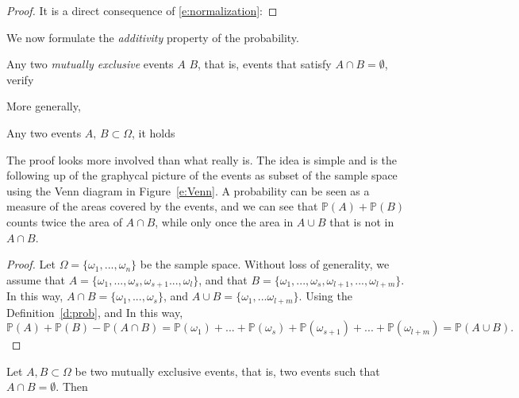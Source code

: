 	\begin{proof}
		It is a direct consequence of \eqref{e:normalization}:

	\end{proof}
	We now formulate the \emph{additivity} property of the probability. 
	\begin{proposition}[Additivity]
		\label{p:monotone}
		Any two \emph{mutually exclusive} events $A$ $B$, that is, events that satisfy  $A\cap B=\emptyset$, verify
	\end{proposition}
		More generally, 
	\begin{proposition}
		\label{p:exclusive}
		Any two events $A,\, B\subset \Omega$, it holds  
	\end{proposition}
	 The proof looks more involved than what really is. The idea is simple and is the following up of the graphycal picture of the events as subset of the sample space using the Venn diagram in Figure~\ref{e:Venn}. A probability can be seen as a measure of the areas covered by the events, and we can see that $\mathbb P(A)  + \mathbb P(B)$ counts twice the area of $A \cap B$, while only once the area in $A \cup B$ that is not in $A \cap B$.  
	\begin{proof}
	Let $\Omega=\{\omega_1,...,\omega_n\}$ be the sample space. Without loss of generality, we assume that $A=\{\omega_1,...,\omega_s,\omega_{s+1}...,\omega_l\}$, and that $B=\{\omega_1,...,\omega_s,\omega_{l+1},...,\omega_{l+m}\}$. In this way, $A\cap B=\{\omega_1,...,\omega_s\}$, and $A\cup B=\{\omega_1,...\omega_{l+m}\}$. Using the Definition~\ref{d:prob}, 
	and 
	In this way, $$\mathbb{P}(A)+\mathbb{P}(B)-\mathbb{P}(A\cap B)=\mathbb{P}(\omega_1)+...+\mathbb{P}(\omega_s)+\mathbb{P}(\omega_{s+1})+...+\mathbb{P}(\omega_{l+m})=\mathbb{P}(A\cup B).$$
	\end{proof}
	\begin{corollary}\label{}
		Let $A,B\subset\Omega$ be two mutually exclusive events, that is, two events such that $A\cap B = \emptyset$. Then 
	\end{corollary}
